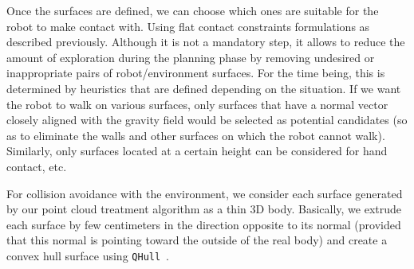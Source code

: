 


Once the surfaces are defined, we can choose which ones are suitable for the robot to make contact with.
Using flat contact constraints formulations as described previously.
Although it is not a mandatory step, it allows to reduce the amount of exploration during the planning phase by removing undesired or inappropriate pairs of robot/environment surfaces.
For the time being, this is determined by heuristics that are defined depending on the situation.
If we want the robot to walk on various surfaces, only surfaces that have a normal vector closely aligned with the gravity field would be selected as potential candidates (so as to eliminate the walls and other surfaces on which the robot cannot walk).
Similarly, only surfaces located at a certain height can be considered for hand contact, etc.

For collision avoidance with the environment, we consider each surface generated by our point cloud treatment algorithm as a thin 3D body.
Basically, we extrude each surface by few centimeters in the direction opposite to its normal (provided that this normal is pointing toward the outside of the real body) and create a convex hull surface using {\tt QHull}~\cite{qhull:acm:1996}.

